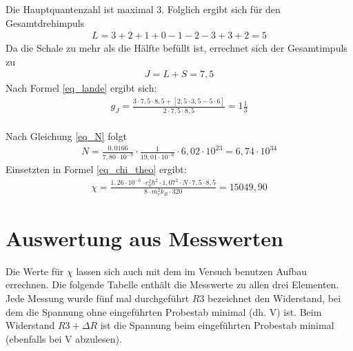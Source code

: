Die Hauptquantenzahl ist maximal 3. Folglich ergibt sich für den Gesamtdrehimpuls
\begin{align*}
L= 3+2+1+0-1-2-3+3+2=5
\end{align*} 
Da die Schale zu mehr als die Hälfte befüllt ist, errechnet sich der Gesamtimpuls zu 
\begin{align*}
J=L+S=7,5
\end{align*}
Nach Formel \eqref{eq_lande} ergibt sich:
\begin{align}
g_J=\frac{3\cdot7,5\cdot8,5+[2,5\cdot3,5-5\cdot6]}{2\cdot 7,5\cdot8,5}=1 \frac{1}{3}
\end{align}\\
Nach Gleichung \eqref{eq_N} folgt
\begin{align}
	N=\frac{0,0166}{7,80\cdot10^{-9}}\cdot\frac{1}	{19,01\cdot10^{-6}}\cdot6,02\cdot10^{23}=6,74\cdot10^{34}
\end{align}
Einsetzten in Formel \eqref{eq_chi_theo} ergibt:
\begin{align}
\chi= \frac{1,26\cdot 10^{-6}\cdot e_0^2\hbar^2\cdot 1,07^2 \cdot N\cdot 7,5\cdot 8,5}{8\cdot m_e^2 k_B\cdot320}=15049,90
\end{align}

\section{Auswertung aus Messwerten}
Die Werte für $\chi$ lassen sich auch mit dem im Versuch benutzen Aufbau errechnen. Die folgende Tabelle enthält die Messwerte zu allen drei Elementen. Jede Messung wurde fünf mal durchgeführt $R3$ bezeichnet den Widerstand, bei dem die Spannung ohne eingeführten Probestab minimal (dh. V) ist. Beim Widerstand $R3 + \Delta R$ ist die Spannung beim eingeführten Probestab minimal (ebenfalls bei V abzulesen).

